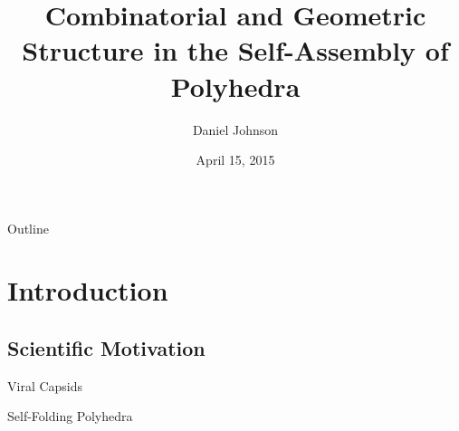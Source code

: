\documentclass{beamer}
\title{Combinatorial and Geometric Structure in the Self-Assembly of Polyhedra}
\author{Daniel Johnson}
\date{April 15, 2015}
\begin{document}

\frame{\titlepage}

\section[Outline]{}
\begin{frame}{Outline}
  \tableofcontents
\end{frame}

\section{Introduction}
\subsection{Scientific Motivation}
\begin{frame}{Viral Capsids}
\end{frame}
\begin{frame}{Self-Folding Polyhedra}
\end{frame}
\end{document}
